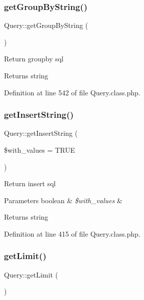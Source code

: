 \subsubsection{\texorpdfstring{get\+Group\+By\+String()}{getGroupByString()}}
{\footnotesize\ttfamily Query\+::get\+Group\+By\+String (\begin{DoxyParamCaption}{ }\end{DoxyParamCaption})}

Return groupby sql \begin{DoxyReturn}{Returns}
string 
\end{DoxyReturn}


Definition at line 542 of file Query.\+class.\+php.

\mbox{\label{classQuery_a9e51002db6dbd8743dc9395a42d1d2dc}} 
\subsubsection{\texorpdfstring{get\+Insert\+String()}{getInsertString()}}
{\footnotesize\ttfamily Query\+::get\+Insert\+String (\begin{DoxyParamCaption}\item[{}]{\$with\+\_\+values = {\ttfamily TRUE} }\end{DoxyParamCaption})}

Return insert sql 
\begin{DoxyParams}[1]{Parameters}
boolean & {\em \$with\+\_\+values} & \\
\hline
\end{DoxyParams}
\begin{DoxyReturn}{Returns}
string 
\end{DoxyReturn}


Definition at line 415 of file Query.\+class.\+php.

\mbox{\label{classQuery_a4ce13762176a83bd5b79e162dded72c9}} 
\subsubsection{\texorpdfstring{get\+Limit()}{getLimit()}}
{\footnotesize\ttfamily Query\+::get\+Limit (\begin{DoxyParamCaption}{ }\end{DoxyParamCaption})}



